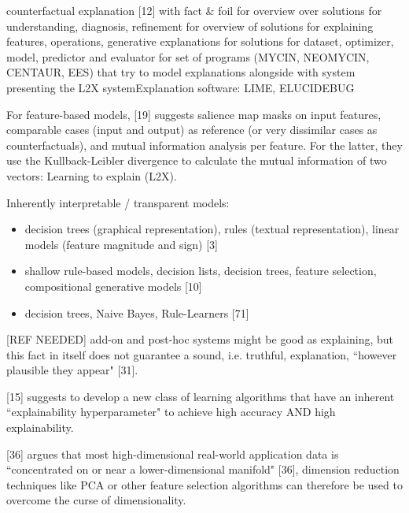 counterfactual explanation [12] with fact \& foil \newline
[4] for overview over solutions for understanding, diagnosis, refinement \newline
[6] for overview of solutions for explaining features, operations, generative explanations \newline
[16] for solutions for dataset, optimizer, model, predictor and evaluator \newline
[14] for set of programs (MYCIN, NEOMYCIN, CENTAUR, EES) that try to model explanations alongside with system \newline
[19] presenting the L2X system\newline
[24] Explanation software: LIME, ELUCIDEBUG

For feature-based models, [19] suggests salience map masks on input features, comparable cases (input and output) as reference (or very dissimilar cases as counterfactuals), and mutual information analysis per feature. For the latter, they use the Kullback-Leibler divergence to calculate the mutual information of two vectors: Learning to explain (L2X).\newline

Inherently interpretable / transparent models:
\begin{itemize}
	\item decision trees (graphical representation), rules (textual representation), linear models (feature magnitude and sign) [3]
	\item shallow rule-based models, decision lists, decision trees, feature selection, compositional generative models [10]
	\item decision trees, Naive Bayes, Rule-Learners [71]
\end{itemize}

[{\color{red}REF NEEDED}] add-on and post-hoc systems might be good as explaining, but this fact in itself does not guarantee a sound, i.e. truthful, explanation, ``however plausible they appear" [31]. \newline

[15] suggests to develop a new class of learning algorithms that have an inherent ``explainability hyperparameter" to achieve high accuracy AND high explainability.\newline

[36] argues that most high-dimensional real-world application data is ``concentrated on or near a lower-dimensional manifold" [36], dimension reduction techniques like PCA or other feature selection algorithms can therefore be used to overcome the curse of dimensionality. \newline

